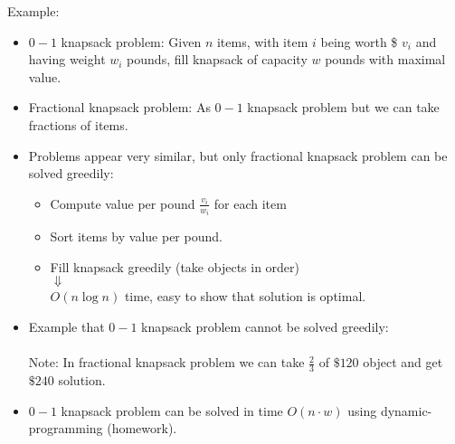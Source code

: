 \documentclass[11pt]{article}
\begin{document}
Example:
\begin{itemize}
\item {\sc $0-1$ knapsack problem}: Given $n$ items, with item $i$
  being worth \$ $v_i$  and having weight $w_i$ pounds, fill knapsack of
  capacity $w$ pounds with maximal value.
  
\item {\sc Fractional knapsack problem}: As {\sc $0-1$ knapsack
  problem} but we can take fractions of items.
\item Problems appear very similar, but only {\sc fractional
  knapsack problem} can be solved greedily:
  \begin{itemize}
  \item Compute value per pound $\frac{v_i}{w_i}$ for each item
  \item Sort items by value per pound.
  \item Fill knapsack greedily (take objects in order) \\
    $\Downarrow$ \\
    $O(n\log n)$ time, easy to show that solution is optimal.
  \end{itemize}
  
\item Example that {\sc $0-1$ knapsack problem} cannot be solved
  greedily: \\ \\
  
  Note: In {\sc fractional knapsack problem} we can take
  $\frac{2}{3}$ of $\$120$ object and get $\$240$ solution.


\item {\sc $0-1$ knapsack problem} can be solved in time $O(n \cdot w)$
  using dynamic-programming (homework).
\end{itemize}

\end{document}

